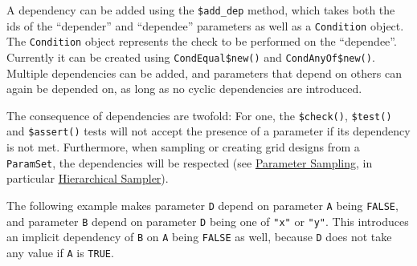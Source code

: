 \documentclass[]{article}
\newenvironment{Shaded}{\begin{snugshade}}{\end{snugshade}}
\newcommand{\CommentTok}[1]{\textcolor[rgb]{0.56,0.35,0.01}{\textit{#1}}}
\newcommand{\DataTypeTok}[1]{\textcolor[rgb]{0.13,0.29,0.53}{#1}}
\newcommand{\DecValTok}[1]{\textcolor[rgb]{0.00,0.00,0.81}{#1}}
\newcommand{\KeywordTok}[1]{\textcolor[rgb]{0.13,0.29,0.53}{\textbf{#1}}}
\newcommand{\NormalTok}[1]{#1}
\newcommand{\OperatorTok}[1]{\textcolor[rgb]{0.81,0.36,0.00}{\textbf{#1}}}
\newcommand{\OtherTok}[1]{\textcolor[rgb]{0.56,0.35,0.01}{#1}}
\newcommand{\StringTok}[1]{\textcolor[rgb]{0.31,0.60,0.02}{#1}}
\renewenvironment{Shaded} {\begin{snugshade}\small} {\end{snugshade}}
\begin{document}
A dependency can be added using the \texttt{\$add\_dep} method, which takes both the ids of the ``depender'' and ``dependee'' parameters as well as a \texttt{Condition} object.
The \texttt{Condition} object represents the check to be performed on the ``dependee''.
Currently it can be created using \texttt{CondEqual\$new()} and \texttt{CondAnyOf\$new()}.
Multiple dependencies can be added, and parameters that depend on others can again be depended on, as long as no cyclic dependencies are introduced.

The consequence of dependencies are twofold:
For one, the \texttt{\$check()}, \texttt{\$test()} and \texttt{\$assert()} tests will not accept the presence of a parameter if its dependency is not met.
Furthermore, when sampling or creating grid designs from a \texttt{ParamSet}, the dependencies will be respected (see \protect\hyperlink{parameter-sampling}{Parameter Sampling}, in particular \protect\hyperlink{hierarchical-sampler}{Hierarchical Sampler}).

The following example makes parameter \texttt{D} depend on parameter \texttt{A} being \texttt{FALSE}, and parameter \texttt{B} depend on parameter \texttt{D} being one of \texttt{"x"} or \texttt{"y"}.
This introduces an implicit dependency of \texttt{B} on \texttt{A} being \texttt{FALSE} as well, because \texttt{D} does not take any value if \texttt{A} is \texttt{TRUE}.

\begin{Shaded}
\end{Shaded}

\begin{Shaded}
\end{Shaded}
\end{document}
